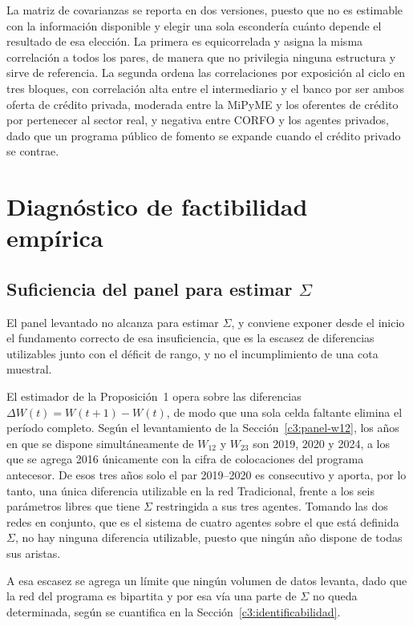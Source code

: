 La matriz de covarianzas se reporta en dos versiones, puesto que no es estimable con la información disponible y elegir una sola escondería cuánto depende el resultado de esa elección. La primera es equicorrelada y asigna la misma correlación a todos los pares, de manera que no privilegia ninguna estructura y sirve de referencia. La segunda ordena las correlaciones por exposición al ciclo en tres bloques, con correlación alta entre el intermediario y el banco por ser ambos oferta de crédito privada, moderada entre la MiPyME y los oferentes de crédito por pertenecer al sector real, y negativa entre CORFO y los agentes privados, dado que un programa público de fomento se expande cuando el crédito privado se contrae.

\section{Diagnóstico de factibilidad empírica}
\label{c3:diagnostico}

\subsection[Suficiencia del panel para estimar Sigma]{Suficiencia del panel para estimar $\Sigma$}
\label{c3:teorema5-aplicado}

El panel levantado no alcanza para estimar $\Sigma$, y conviene exponer desde el inicio el fundamento correcto de esa insuficiencia, que es la escasez de diferencias utilizables junto con el déficit de rango, y no el incumplimiento de una cota muestral.

El estimador de la Proposición~1 opera sobre las diferencias $\Delta W(t) = W(t+1)-W(t)$, de modo que una sola celda faltante elimina el período completo. Según el levantamiento de la Sección~\ref{c3:panel-w12}, los años en que se dispone simultáneamente de $W_{12}$ y $W_{23}$ son 2019, 2020 y 2024, a los que se agrega 2016 únicamente con la cifra de colocaciones del programa antecesor. De esos tres años solo el par 2019--2020 es consecutivo y aporta, por lo tanto, una única diferencia utilizable en la red Tradicional, frente a los seis parámetros libres que tiene $\Sigma$ restringida a sus tres agentes. Tomando las dos redes en conjunto, que es el sistema de cuatro agentes sobre el que está definida $\Sigma$, no hay ninguna diferencia utilizable, puesto que ningún año dispone de todas sus aristas.

A esa escasez se agrega un límite que ningún volumen de datos levanta, dado que la red del programa es bipartita y por esa vía una parte de $\Sigma$ no queda determinada, según se cuantifica en la Sección~\ref{c3:identificabilidad}.

